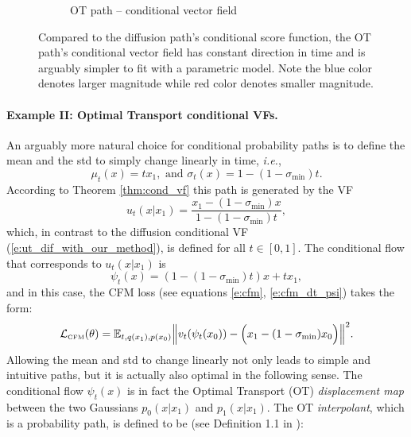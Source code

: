 \documentclass{article}
\makeatletter
\renewcommand*{\ie}{{\it i.e.}\@\xspace}
\newcommand{\sigmamin}{\sigma_{\text{min}}}
\makeatother
\begin{document}
\begin{figure}
\begin{subfigure}[t]{0.43\linewidth}
\begin{subfigure}[t]{0.23\linewidth}
        \vspace{-1.5em}
        \caption*{}
    \end{subfigure}\vspace{-5pt}
\caption*{OT path -- conditional vector field}
\end{subfigure}\vspace{-5pt}
\caption{Compared to the diffusion path's conditional score function, the OT path's conditional vector field has constant direction in time and is arguably simpler to fit with a parametric model. Note the blue color denotes larger magnitude while red color denotes smaller magnitude.\vspace{-5pt}}
\label{fig:2d_fv}
\end{figure}

\paragraph{Example II: Optimal Transport conditional VFs.}
An arguably more natural choice for conditional probability paths is to define the mean and the std to simply change linearly in time, \ie, 
\begin{equation}
    \mu_t(x) = tx_1, \text{ and } \sigma_t(x) = 1-(1-\sigmamin)t.
\end{equation}
According to Theorem \ref{thm:cond_vf} this path is generated by the VF
\begin{equation}\label{e:ut_ot}
    u_t(x|x_1)= \frac{x_1-(1-\sigmamin)x}{1-(1-\sigmamin)t},
\end{equation}
which, in contrast to the diffusion conditional VF (\eqref{e:ut_dif_with_our_method}), is defined for all $t\in[0,1]$. The conditional flow that corresponds to $u_t(x|x_1)$ is \begin{equation}\label{e:phi_t_ot}
    \psi_t(x) = (1-(1-\sigmamin)t)x + tx_1,
\end{equation}
and in this case, the CFM loss (see equations \ref{e:cfm}, \ref{e:cfm_dt_psi}) takes the form: 
\begin{equation}\label{e:cfm_cond_ot}
     {\mathcal{L}}_{\scriptscriptstyle \text{CFM}}(\theta) 
     =\mathbb{E}_{t, q(x_1), p(x_0)} \Big\|v_t(\psi_t(x_0)) - \Big (x_1 - (1-\sigma_{\min})x_0\Big) \Big\|^2.     
\end{equation}
%
Allowing the mean and std to change linearly not only leads to simple and intuitive paths, but it is actually also optimal in the following sense.
%
{The conditional flow $\psi_t(x)$} is in fact the Optimal Transport (OT) \emph{displacement map} between the two Gaussians $p_0(x|x_1)$ and $p_1(x|x_1)$. The OT \emph{interpolant}, which is a probability path, is defined to be (see Definition 1.1 in \cite{mccann1997convexity}):
\end{document}
